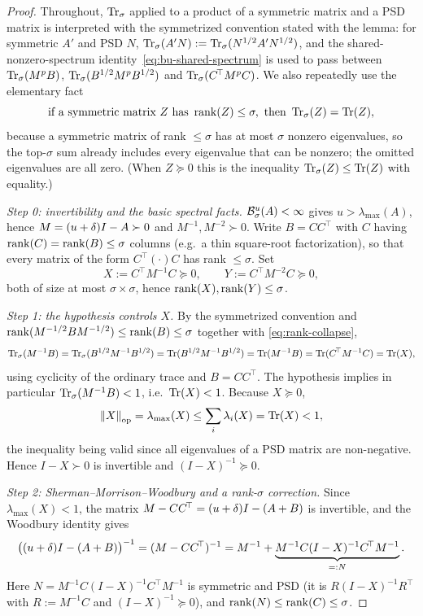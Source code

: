 \begin{proof}
Throughout, $\operatorname{Tr}_{\sigma}$ applied to a product of a symmetric matrix and a PSD
matrix is interpreted with the symmetrized convention stated with the lemma:
for symmetric $A'$ and PSD $N$, $\operatorname{Tr}_{\sigma}(A'N):=\operatorname{Tr}_{\sigma}(N^{1/2}A'N^{1/2})$, and
the shared-nonzero-spectrum identity~\eqref{eq:bu-shared-spectrum} is used to pass
between $\operatorname{Tr}_{\sigma}(M^{p}B)$, $\operatorname{Tr}_{\sigma}(B^{1/2}M^{p}B^{1/2})$ and
$\operatorname{Tr}_{\sigma}(C^{\!\top}M^{p}C)$.
We also repeatedly use the elementary fact
\begin{equation}\label{eq:rank-collapse}
  \text{if a symmetric matrix }Z\text{ has }\operatorname{rank}(Z)\le\sigma,\text{ then }
  \operatorname{Tr}_{\sigma}(Z)=\operatorname{Tr}(Z),
\end{equation}
because a symmetric matrix of rank $\le\sigma$ has at most $\sigma$ nonzero
eigenvalues, so the top-$\sigma$ sum already includes every eigenvalue that can
be nonzero; the omitted eigenvalues are all zero. (When $Z\succeq0$ this is the
inequality $\operatorname{Tr}_{\sigma}(Z)\le\operatorname{Tr}(Z)$ with equality.)

\medskip\noindent\emph{Step 0: invertibility and the basic spectral facts.}\quad
$\mathcal{B}^{u}_{\sigma}(A)<\infty$ gives $u>\lambda_{\max}(A)$, hence
$M=(u+\delta)I-A\succ0$ and $M^{-1},M^{-2}\succ0$. Write $B=CC^{\!\top}$ with $C$
having $\operatorname{rank}(C)=\operatorname{rank}(B)\le\sigma$ columns (e.g.\ a thin square-root
factorization), so that every matrix of the form $C^{\!\top}(\cdot)C$ has rank
$\le\sigma$. Set
\[
  X:=C^{\!\top}M^{-1}C\succeq0,\qquad Y:=C^{\!\top}M^{-2}C\succeq0,
\]
both of size at most $\sigma\times\sigma$, hence $\operatorname{rank}(X),\operatorname{rank}(Y)\le\sigma$.

\medskip\noindent\emph{Step 1: the hypothesis controls $X$.}\quad
By the symmetrized convention and $\operatorname{rank}(M^{-1/2}BM^{-1/2})\le\operatorname{rank}(B)\le\sigma$
together with \eqref{eq:rank-collapse},
\[
  \operatorname{Tr}_{\sigma}(M^{-1}B)=\operatorname{Tr}_{\sigma}(B^{1/2}M^{-1}B^{1/2})=\operatorname{Tr}(B^{1/2}M^{-1}B^{1/2})
   =\operatorname{Tr}(M^{-1}B)=\operatorname{Tr}(C^{\!\top}M^{-1}C)=\operatorname{Tr}(X),
\]
using cyclicity of the ordinary trace and $B=CC^{\!\top}$. The hypothesis implies
in particular $\operatorname{Tr}_{\sigma}(M^{-1}B)<1$, i.e.\ $\operatorname{Tr}(X)<1$. Because $X\succeq0$,
\begin{equation}\label{eq:opnorm-trace}
  \left\lVert X \right\rVert_{\mathrm{op}}=\lambda_{\max}(X)\le\sum_i\lambda_i(X)=\operatorname{Tr}(X)<1,
\end{equation}
the inequality being valid since all eigenvalues of a PSD matrix are
non-negative. Hence $I-X\succ0$ is invertible and $(I-X)^{-1}\succeq0$.

\medskip\noindent\emph{Step 2: Sherman--Morrison--Woodbury and a rank-$\sigma$
correction.}\quad
Since $\lambda_{\max}(X)<1$, the matrix $M-CC^{\!\top}=(u+\delta)I-(A+B)$ is
invertible, and the Woodbury identity gives
\begin{equation}\label{eq:woodbury}
  \bigl((u+\delta)I-(A+B)\bigr)^{-1}
   =(M-CC^{\!\top})^{-1}
   = M^{-1} + \underbrace{M^{-1}C(I-X)^{-1}C^{\!\top}M^{-1}}_{=:N}.
\end{equation}
Here $N=M^{-1}C(I-X)^{-1}C^{\!\top}M^{-1}$ is symmetric and PSD (it is
$R(I-X)^{-1}R^{\!\top}$ with $R:=M^{-1}C$ and $(I-X)^{-1}\succeq0$), and
$\operatorname{rank}(N)\le\operatorname{rank}(C)\le\sigma$.


\end{proof}
